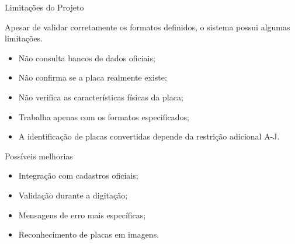 \documentclass[aspectratio=169,12pt]{beamer}
\begin{document}
\begin{frame}{Limitações do Projeto}

    Apesar de validar corretamente os formatos definidos,
    o sistema possui algumas limitações.

    \begin{itemize}
        \item Não consulta bancos de dados oficiais;
        \item Não confirma se a placa realmente existe;
        \item Não verifica as características físicas da placa;
        \item Trabalha apenas com os formatos especificados;
        \item A identificação de placas convertidas depende
        da restrição adicional A-J.
    \end{itemize}

    \vspace{0.4cm}

    \begin{block}{Possíveis melhorias}
        \begin{itemize}
            \item Integração com cadastros oficiais;
            \item Validação durante a digitação;
            \item Mensagens de erro mais específicas;
            \item Reconhecimento de placas em imagens.
        \end{itemize}
    \end{block}

\end{frame}

\end{document}
